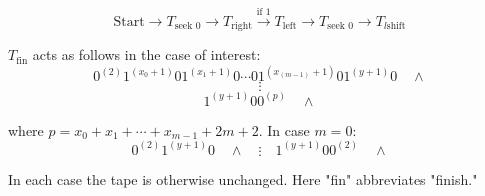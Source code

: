 $$\text{Start} \rightarrow T_{\text{seek 0}} \rightarrow T_{\text{right}} \xrightarrow{\text{if 1}} T_{\text{left}} \rightarrow T_{\text{seek 0}} \rightarrow T_{l\text{shift}}$$

$T_{\text{fin}}$ acts as follows in the case of interest:
\[
0^{(2)} 1^{(x_0+1)} 0 1^{(x_1+1)} 0 \cdots 0 1^{(x_{(m-1)}+1)} 0 1^{(y+1)} 0 \quad \land
\]
\[
\vdots
\]
\[
1^{(y+1)} 0 0^{(p)} \quad \land
\]

where $p = x_0 + x_1 + \cdots + x_{m-1} + 2m + 2$. In case $m = 0$:
\[
0^{(2)} 1^{(y+1)} 0 \quad \land \quad \vdots \quad 1^{(y+1)} 0 0^{(2)} \quad \land
\]

In each case the tape is otherwise unchanged. Here "fin" abbreviates "finish."
